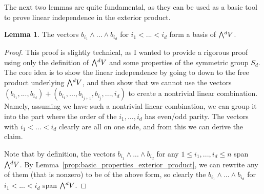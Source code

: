 \documentclass{scrartcl}
\newcommand{\extpow}{\mathchoice{{\textstyle\bigwedge}}
    {{\bigwedge}}
    {{\textstyle\wedge}}
    {{\scriptstyle\wedge}}}
\theoremstyle{definition}
\newtheorem{lemma}[subsection]{Lemma}
\begin{document}
The next two lemmas are quite fundamental, as they can be used as a basic tool to prove linear independence in the exterior product.
\begin{lemma}
    \label{prop:basis_product_independence}
    The vectors $b_{i_1} \wedge ... \wedge b_{i_d}$ for $i_1 < ... < i_d$ form a basis of $\extpow^d V$.
\end{lemma}
\begin{proof}
    This proof is slightly technical, as I wanted to provide a rigorous proof using only the definition of $\extpow^d V$ and some properties of the symmetric group $S_d$.
    The core idea is to show the linear independence by going to down to the free product underlying $\extpow^d V$, and then show that we cannot use the vectors $(b_{i_1}, ..., b_{i_d}) + (b_{i_1}, ..., b_{i_{j + 1}}, b_{i_j}, ..., i_d)$ to create a nontrivial linear combination.
    Namely, assuming we have such a nontrivial linear combination, we can group it into the part where the order of the $i_1, ..., i_d$ has even/odd parity.
    The vectors with $i_1 < ... < i_d$ clearly are all on one side, and from this we can derive the claim.

    Note that by definition, the vectors $b_{i_1} \wedge ... \wedge b_{i_d}$ for any $1 \leq i_1, ..., i_d \leq n$ span $\extpow^d V$.
    By Lemma~\ref{prop:basic_properties_exterior_product}, we can rewrite any of them (that is nonzero) to be of the above form, so clearly the $b_{i_1} \wedge ... \wedge b_{i_d}$ for $i_1 < ... < i_d$ span $\extpow^d V$.


\end{proof}
\end{document}
